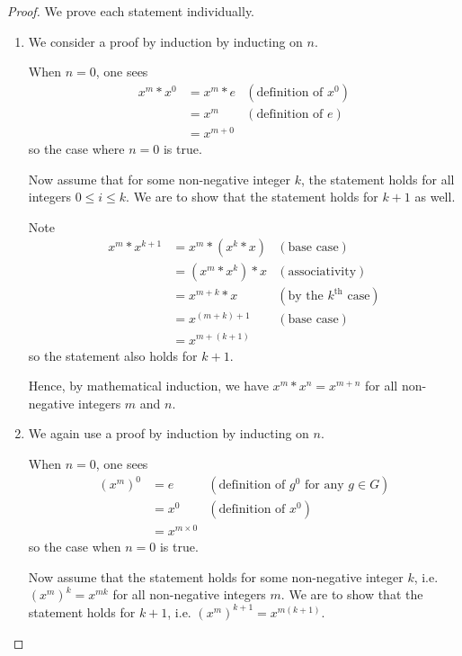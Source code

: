 \newpage

\begin{proof}
    We prove each statement individually.
    \begin{enumerate}
        \item We consider a proof by induction by inducting on $n$.
        
        When $n = 0$, one sees
        \begin{align*}
            x^m \ast x^0 &= x^m \ast e & (\text{definition of }x^0)\\
            &= x^m & (\text{definition of }e)\\
            &= x^{m+0}
        \end{align*}
        so the case where $n=0$ is true.

        Now assume that for some non-negative integer $k$, the statement holds for all integers $0 \leq i \leq k$. We are to show that the statement holds for $k+1$ as well.

        Note
        \begin{align*}
            x^m\ast x^{k+1} &= x^m\ast (x^k\ast x) & (\text{base case})\\
            &= (x^m \ast x^k) \ast x & (\text{associativity})\\
            &= x^{m+k}\ast x & (\text{by the }k^{\text{th}}\text{ case})\\
            &= x^{(m+k)+1} & (\text{base case})\\
            &= x^{m+(k+1)}
        \end{align*}
        so the statement also holds for $k+1$.

        Hence, by mathematical induction, we have $x^m \ast x^n = x^{m+n}$ for all non-negative integers $m$ and $n$.
        
        \item We again use a proof by induction by inducting on $n$.
        
        When $n = 0$, one sees
        \begin{align*}
            \left(x^m\right)^0 &= e & (\text{definition of }g^0 \text{ for any }g\in G)\\
            &= x^0 & (\text{definition of }x^0)\\
            &= x^{m \times 0}
        \end{align*}
        so the case when $n = 0$ is true.

        Now assume that the statement holds for some non-negative integer $k$, i.e. $\left(x^m\right)^k = x^{mk}$ for all non-negative integers $m$. We are to show that the statement holds for $k+1$, i.e. $\left(x^m\right)^{k+1} = x^{m(k+1)}$.


\end{enumerate}
\end{proof}
